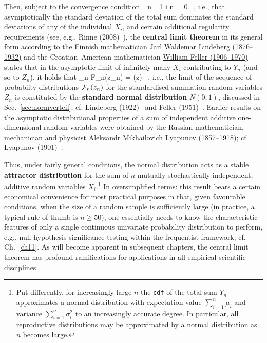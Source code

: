 \medskip
\noindent
Then, subject to the convergence condition
%
\be
\lim_{n \to \infty}\max_{1 \leq i \leq 
n} = 0 \ ,
\ee
%
i.e., that asymptotically the standard deviation of the total sum 
dominates the standard deviations of any of the individual $X_{i}$,
and certain additional regularity requirements (see, e.g., Rinne
(2008)~), the \textbf{central limit theorem}
in its general form according to the Finnish mathematician 
\href{http://en.wikipedia.org/wiki/Jarl_Waldemar_Lindeberg}{Jarl 
Waldemar Lindeberg (1876--1932)} and the Croatian--American 
mathematician 
\href{http://www-history.mcs.st-and.ac.uk/Biographies/Feller.html}{William Feller (1906--1970)} states that in the asymptotic limit 
of infinitely many $X_{i}$ contributing to $Y_{n}$ (and so to
$Z_{n}$), it holds that
%
\be
\lim_{n \to \infty}{\cal F}_{n}(z_{n}) = \Phi(z) \ ,
\ee
%
i.e., the limit of the sequence of probabiity distributions ${\cal 
F}_{n}(z_{n})$ for the standardised summation random variables 
$Z_{n}$ is constituted by the \textbf{standard normal distribution} 
$N(0;1)$, discussed in Sec.~\ref{sec:normverteil}; cf. Lindeberg 
(1922)~ and Feller (1951)~. Earlier 
results on the asymptotic distributional properties of a 
sum of independent additive one-dimensional random variables were 
obtained by the Russian mathematician, mechanician and physicist 
\href{http://www-history.mcs.st-and.ac.uk/Biographies/Lyapunov.html}{Aleksandr Mikhailovich Lyapunov (1857--1918)}; cf. Lyapunov 
(1901)~.

\medskip
\noindent
Thus, under fairly general conditions, the normal distribution 
acts as a stable \textbf{attractor distribution} for the sum of $n$ 
mutually stochastically independent, additive random variables 
$X_{i}$.\footnote{Put differently, for 
increasingly large $n$ the \texttt{cdf} of the total sum 
$Y_{n}$ approximates a normal distribution with expectation value 
$\displaystyle\sum_{i=1}^{n}\mu_{i}$ and variance 
$\displaystyle\sum_{i=1}^{n}\sigma_{i}^{2}$ to an increasingly 
accurate degree. In particular, all reproductive distributions 
may be approximated by a normal distribution as $n$ becomes 
large.} In oversimplified terms: this result bears a certain 
economical convenience for most practical purposes in that, given 
favourable conditions, when the size of a random sample is 
sufficiently large (in practice, a typical rule of thumb is $n 
\geq 50$), one essentially needs to know the characteristic 
features of only a single continuous univariate probability 
distribution to perform, e.g., null hypothesis significance testing
within the frequentist framework; cf. Ch.~\ref{ch11}. 
As will become apparent in subsequent chapters, 
the central limit theorem has profound ramifications for 
applications in all empirical scientific disciplines.

